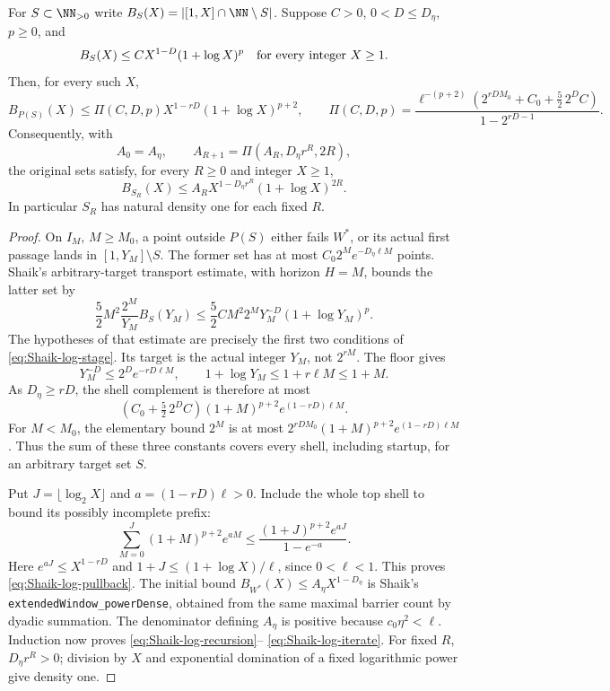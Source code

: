 \begin{proposition}
\label{prop:Shaik-log-pullback}
For \(S\subset\NN_{>0}\) write \(B_S(X)=|[1,X]\cap\NN\setminus S|\).
Suppose \(C>0\), \(0<D\le D_\eta\), \(p\ge0\), and
\[
 B_S(X)\le C X^{1-D}(1+\log X)^p
 \quad\hbox{for every integer }X\ge1 .
\]
Then, for every such \(X\),
\begin{equation}\label{eq:Shaik-log-pullback}
 B_{P(S)}(X)\le
 \Pi(C,D,p)X^{1-rD}(1+\log X)^{p+2},
 \qquad
 \Pi(C,D,p)=
 \frac{\ell^{-(p+2)}
       \left(2^{rDM_0}+C_0+\frac52\,2^D C\right)}
      {1-2^{rD-1}} .
\end{equation}
Consequently, with
\begin{equation}\label{eq:Shaik-log-recursion}
 A_0=A_\eta,\qquad
 A_{R+1}=\Pi(A_R,D_\eta r^R,2R),
\end{equation}
the original sets satisfy, for every \(R\ge0\) and integer \(X\ge1\),
\begin{equation}\label{eq:Shaik-log-iterate}
 B_{S_R}(X)\le A_R X^{1-D_\eta r^R}(1+\log X)^{2R}.
\end{equation}
In particular \(S_R\) has natural density one for each fixed \(R\).
\end{proposition}
\begin{proof}
On \(I_M\), \(M\ge M_0\), a point outside \(P(S)\) either fails
\(W^*\), or its actual first passage lands in \([1,Y_M]\setminus S\).
The former set has at most
\(C_0 2^M e^{-D_\eta\ell M}\) points.
Shaik's arbitrary-target transport estimate, with horizon \(H=M\),
bounds the latter set by
\[
 \frac52 M^2\frac{2^M}{Y_M}B_S(Y_M)
 \le \frac52 C M^2 2^M Y_M^{-D}(1+\log Y_M)^p .
\]
The hypotheses of that estimate are precisely the first two
conditions of \eqref{eq:Shaik-log-stage}. Its target is the actual
integer \(Y_M\), not \(2^{rM}\). The floor gives
\[
 Y_M^{-D}\le 2^D e^{-rD\ell M},\qquad
 1+\log Y_M\le1+r\ell M\le1+M .
\]
As \(D_\eta\ge rD\), the shell complement is therefore at most
\[
 \left(C_0+\tfrac52\,2^D C\right)
       (1+M)^{p+2}e^{(1-rD)\ell M}.
\]
For \(M<M_0\), the elementary bound \(2^M\) is at most
\(2^{rDM_0}(1+M)^{p+2}e^{(1-rD)\ell M}\).
Thus the sum of these three constants covers every shell,
including startup, for an arbitrary target set \(S\).

Put \(J=\lfloor\log_2X\rfloor\) and \(a=(1-rD)\ell>0\).
Include the whole top shell to bound its possibly incomplete prefix:
\[
 \sum_{M=0}^J(1+M)^{p+2}e^{aM}
 \le\frac{(1+J)^{p+2}e^{aJ}}{1-e^{-a}}.
\]
Here \(e^{aJ}\le X^{1-rD}\) and
\(1+J\le(1+\log X)/\ell\), since \(0<\ell<1\).
This proves \eqref{eq:Shaik-log-pullback}.
The initial bound
\(B_{W^*}(X)\le A_\eta X^{1-D_\eta}\) is Shaik's
\texttt{extendedWindow\_powerDense}, obtained from the same maximal
barrier count by dyadic summation. The denominator defining \(A_\eta\)
is positive because \(c_0\eta^2<\ell\).
Induction now proves \eqref{eq:Shaik-log-recursion}--%
\eqref{eq:Shaik-log-iterate}. For fixed \(R\),
\(D_\eta r^R>0\); division by \(X\) and exponential domination of a
fixed logarithmic power give density one.
\end{proof}

